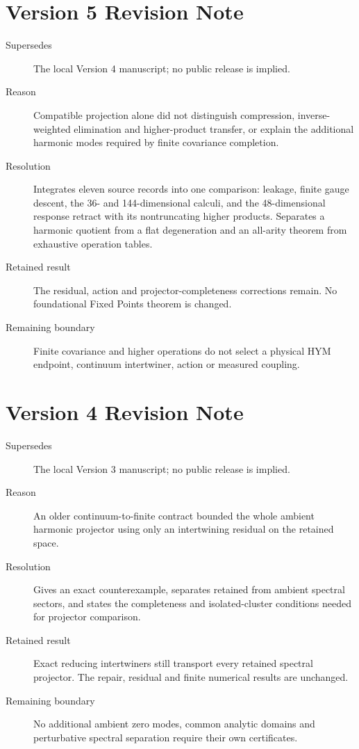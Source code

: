 \documentclass[11pt,a4paper]{article}
\begin{document}
\section*{Version 5 Revision Note}
\begin{description}
\item[Supersedes] The local Version 4 manuscript; no public release is implied.
\item[Reason] Compatible projection alone did not distinguish compression,
inverse-weighted elimination and higher-product transfer, or explain the
additional harmonic modes required by finite covariance completion.
\item[Resolution] Integrates eleven source records into one comparison: leakage,
finite gauge descent, the 36- and 144-dimensional calculi, and the
48-dimensional response retract with its nontruncating higher products.
Separates a harmonic quotient from a flat degeneration and an all-arity
theorem from exhaustive operation tables.
\item[Retained result] The residual, action and projector-completeness
corrections remain. No foundational Fixed Points theorem is changed.
\item[Remaining boundary] Finite covariance and higher operations do not select
a physical HYM endpoint, continuum intertwiner, action or measured coupling.
\end{description}

\section*{Version 4 Revision Note}
\begin{description}
\item[Supersedes] The local Version 3 manuscript; no public release is implied.
\item[Reason] An older continuum-to-finite contract bounded the whole ambient
harmonic projector using only an intertwining residual on the retained space.
\item[Resolution] Gives an exact counterexample, separates retained from ambient
spectral sectors, and states the completeness and isolated-cluster conditions
needed for projector comparison.
\item[Retained result] Exact reducing intertwiners still transport every retained
spectral projector. The repair, residual and finite numerical results are unchanged.
\item[Remaining boundary] No additional ambient zero modes, common analytic
domains and perturbative spectral separation require their own certificates.
\end{description}
\end{document}
